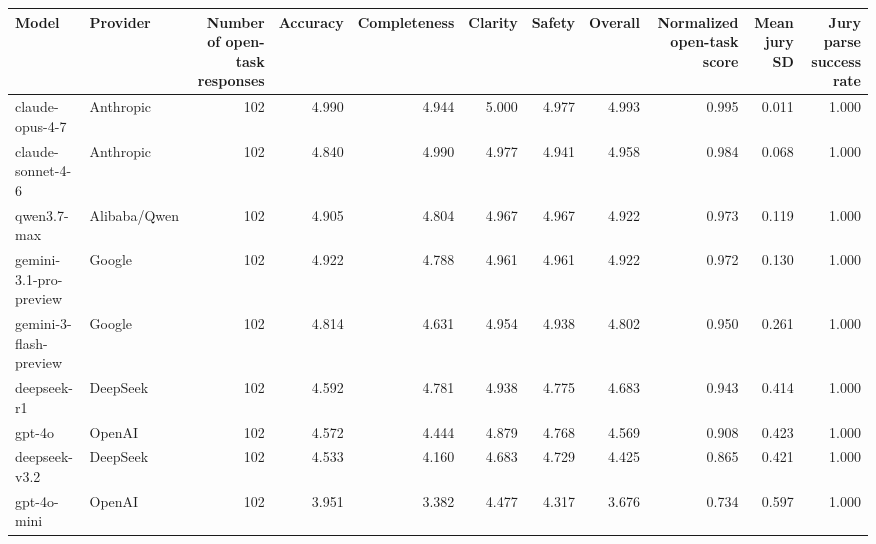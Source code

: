 \begin{tabular}{llrrrrrrrrr}
\toprule
Model & Provider & Number of open-task responses & Accuracy & Completeness & Clarity & Safety & Overall & Normalized open-task score & Mean jury SD & Jury parse success rate \\
\midrule
claude-opus-4-7 & Anthropic & 102 & 4.990 & 4.944 & 5.000 & 4.977 & 4.993 & 0.995 & 0.011 & 1.000 \\
claude-sonnet-4-6 & Anthropic & 102 & 4.840 & 4.990 & 4.977 & 4.941 & 4.958 & 0.984 & 0.068 & 1.000 \\
qwen3.7-max & Alibaba/Qwen & 102 & 4.905 & 4.804 & 4.967 & 4.967 & 4.922 & 0.973 & 0.119 & 1.000 \\
gemini-3.1-pro-preview & Google & 102 & 4.922 & 4.788 & 4.961 & 4.961 & 4.922 & 0.972 & 0.130 & 1.000 \\
gemini-3-flash-preview & Google & 102 & 4.814 & 4.631 & 4.954 & 4.938 & 4.802 & 0.950 & 0.261 & 1.000 \\
deepseek-r1 & DeepSeek & 102 & 4.592 & 4.781 & 4.938 & 4.775 & 4.683 & 0.943 & 0.414 & 1.000 \\
gpt-4o & OpenAI & 102 & 4.572 & 4.444 & 4.879 & 4.768 & 4.569 & 0.908 & 0.423 & 1.000 \\
deepseek-v3.2 & DeepSeek & 102 & 4.533 & 4.160 & 4.683 & 4.729 & 4.425 & 0.865 & 0.421 & 1.000 \\
gpt-4o-mini & OpenAI & 102 & 3.951 & 3.382 & 4.477 & 4.317 & 3.676 & 0.734 & 0.597 & 1.000 \\
\bottomrule
\end{tabular}

